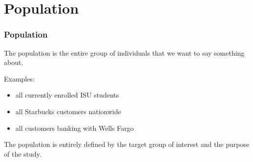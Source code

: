 \documentclass[handout]{beamer}
\begin{document}
\section{Population}
\begin{frame}
\frametitle{Population}
\begin{definition}
The \alert{population} is the entire group of
individuals that we want to say something about.
\end{definition}

\vspace{0.1in} \pause

Examples:
\begin{itemize}
\item all currently enrolled ISU students 
\item all Starbucks customers nationwide 
\item all customers banking with Wells Fargo
\end{itemize}

\vspace{0.1in} \pause

The population is entirely defined by the target group of interest and the 
purpose of the study. 
\end{frame}
\end{document}
